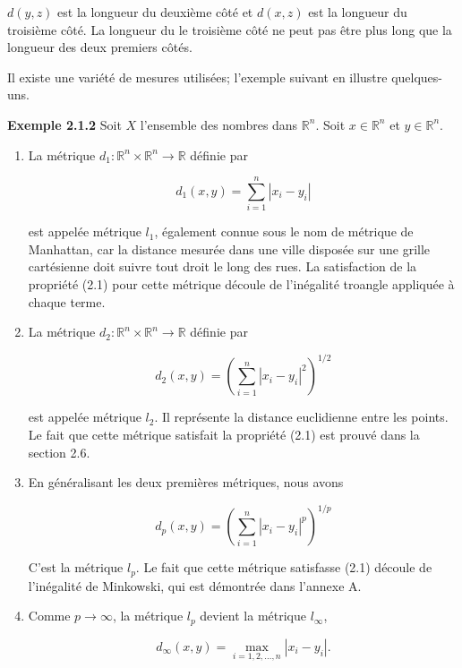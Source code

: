 \documentclass[11pt,twoside,a4paper]{article}
\begin{document}

$d(y, z)$ est la longueur du deuxième côté et $d(x, z)$ est la longueur du troisième côté. 
La longueur du le troisième côté ne peut pas être plus long que la longueur des deux premiers côtés.

\vspace{10mm}

Il existe une variété de mesures utilisées; l'exemple suivant en illustre quelques-uns.


\textbf{Exemple 2.1.2} Soit $X$ l'ensemble des nombres dans $\mathbb{R}^n$. Soit $x \in \mathbb{R}^n$ et $y \in \mathbb{R}^n$.

\begin{enumerate}
  \item La métrique $d_1:\mathbb{R}^n \times \mathbb{R}^n \longrightarrow \mathbb{R}$ définie par
  
  \begin{equation*}
    d_1(x, y) = \sum_{i=1}^{n} |x_i - y_i|
  \end{equation*}
  
  est appelée métrique $l_1$, également connue sous le nom de métrique de Manhattan, car la distance mesurée dans une ville disposée sur une grille 
  cartésienne doit suivre tout droit le long des rues. La satisfaction de la propriété (2.1) pour cette métrique découle de l'inégalité troangle appliquée à chaque terme.
  \item La métrique $d_2:\mathbb{R}^n \times \mathbb{R}^n \longrightarrow \mathbb{R}$ définie par
  
  \begin{equation*}
    d_2(x, y) = \left({\sum_{i=1}^{n} |x_i - y_i|^2}\right)^{1/2}
  \end{equation*}

  est appelée métrique $l_2$. Il représente la distance euclidienne entre les points. Le fait que cette métrique satisfait la propriété (2.1) est prouvé dans la section 2.6.
  \item En généralisant les deux premières métriques, nous avons
  
  \begin{equation*}
    d_p(x, y) = \left({\sum_{i=1}^{n} |x_i - y_i|^p}\right)^{1/p}
  \end{equation*}

  C'est la métrique $l_p$. Le fait que cette métrique satisfasse (2.1) découle de l'inégalité de Minkowski, qui est démontrée dans l'annexe A.
  \item Comme $p \longrightarrow \infty$, la métrique $l_p$ devient la métrique $l_\infty$,
  
  \begin{equation*}
    d_\infty(x, y) = \max\limits_{i=1,2,...,n} |x_i - y_i|.
  \end{equation*}
\end{enumerate}
\end{document}
